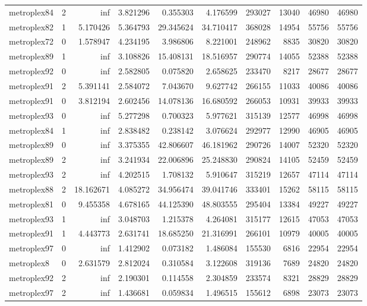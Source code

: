 \begin{longtable}{|l|r|r|r|r|r|r|r|r|r|}
metroplex84 & 2 & inf & 3.821296 & 0.355303 & 4.176599 & 293027 & 13040 & 46980 & 46980 \\
metroplex82 & 1 & 5.170426 & 5.364793 & 29.345624 & 34.710417 & 368028 & 14954 & 55756 & 55756 \\
metroplex72 & 0 & 1.578947 & 4.234195 & 3.986806 & 8.221001 & 248962 & 8835 & 30820 & 30820 \\
metroplex89 & 1 & inf & 3.108826 & 15.408131 & 18.516957 & 290774 & 14055 & 52388 & 52388 \\
metroplex92 & 0 & inf & 2.582805 & 0.075820 & 2.658625 & 233470 & 8217 & 28677 & 28677 \\
metroplex91 & 2 & 5.391141 & 2.584072 & 7.043670 & 9.627742 & 266155 & 11033 & 40086 & 40086 \\
metroplex91 & 0 & 3.812194 & 2.602456 & 14.078136 & 16.680592 & 266053 & 10931 & 39933 & 39933 \\
metroplex93 & 0 & inf & 5.277298 & 0.700323 & 5.977621 & 315139 & 12577 & 46998 & 46998 \\
metroplex84 & 1 & inf & 2.838482 & 0.238142 & 3.076624 & 292977 & 12990 & 46905 & 46905 \\
metroplex89 & 0 & inf & 3.375355 & 42.806607 & 46.181962 & 290726 & 14007 & 52320 & 52320 \\
metroplex89 & 2 & inf & 3.241934 & 22.006896 & 25.248830 & 290824 & 14105 & 52459 & 52459 \\
metroplex93 & 2 & inf & 4.202515 & 1.708132 & 5.910647 & 315219 & 12657 & 47114 & 47114 \\
metroplex88 & 2 & 18.162671 & 4.085272 & 34.956474 & 39.041746 & 333401 & 15262 & 58115 & 58115 \\
metroplex81 & 0 & 9.455358 & 4.678165 & 44.125390 & 48.803555 & 295404 & 13384 & 49227 & 49227 \\
metroplex93 & 1 & inf & 3.048703 & 1.215378 & 4.264081 & 315177 & 12615 & 47053 & 47053 \\
metroplex91 & 1 & 4.443773 & 2.631741 & 18.685250 & 21.316991 & 266101 & 10979 & 40005 & 40005 \\
metroplex97 & 0 & inf & 1.412902 & 0.073182 & 1.486084 & 155530 & 6816 & 22954 & 22954 \\
metroplex8 & 0 & 2.631579 & 2.812024 & 0.310584 & 3.122608 & 319136 & 7689 & 24820 & 24820 \\
metroplex92 & 2 & inf & 2.190301 & 0.114558 & 2.304859 & 233574 & 8321 & 28829 & 28829 \\
metroplex97 & 2 & inf & 1.436681 & 0.059834 & 1.496515 & 155612 & 6898 & 23073 & 23073 \\

\end{longtable}
